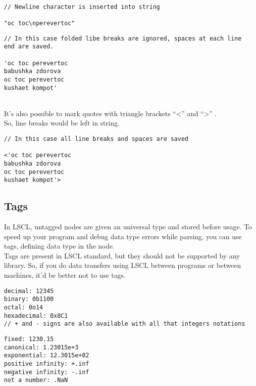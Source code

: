 ~\\
\begin{minipage}{0.45\textwidth}
\begin{lstlisting}[caption = double-quoted style]
// Newline character is inserted into string

"oc toc\nperevertoc"
\end{lstlisting}
\end{minipage}
\hfill
\begin{minipage}{0.45\textwidth}
\begin{lstlisting}[caption = multiline scalar]
// In this case folded libe breaks are ignored, spaces at each line end are saved.

'oc toc perevertoc
babushka zdorova
oc toc perevertoc
kushaet kompot'
\end{lstlisting}
\end{minipage}
~\\
It's also possible to mark quotes with triangle brackets ``<'' and ``>'' .\\
So, line breaks would be left in string.
\begin{lstlisting}[caption = multiline scalar with linebreaks]
// In this case all line breaks and spaces are saved

<'oc toc perevertoc
babushka zdorova
oc toc perevertoc
kushaet kompot'>
\end{lstlisting}

\subsection{Tags}
In LSCL, untagged nodes are given an universal type and stored before usage. To speed up your program and debug data type errors while parsing, you can use tags, defining data type in the node. \\
Tags are present in LSCL standard, but they should not be supported by any library. So, if you do data transfers using LSCL between programs or between machines, it'd be better not to use tags. \\
\begin{lstlisting}[caption = integers]
decimal: 12345
binary: 0b1100
octal: 0o14
hexadecimal: 0x8C1
// + and - signs are also available with all that integers notations
\end{lstlisting}

\begin{lstlisting}[caption = floating point]
fixed: 1230.15
canonical: 1.23015e+3
exponential: 12.3015e+02
positive infinity: +.inf
negative infinity: -.inf
not a number: .NaN
\end{lstlisting}

